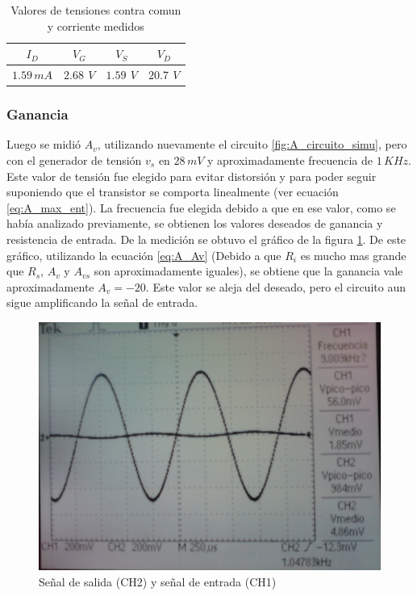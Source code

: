 \documentclass[10pt,spanish,a4paper,notitlepage]{article}
\begin{document}
\begin{table}[H]
    \centering
    \begin{tabular}{|c|c|c|c|} %
    \hline
    $I_D$ & $V_{G}$ & $V_{S}$ & $V_{D}$ \\ \hline
     $1.59\,\unit{mA}$ & $2.68\,\unit{\ V}$  & $1.59\,\unit{\ V}$  & $20.7\,\unit{\ V}$  \\ \hline
    \end{tabular}
    \caption{Valores de tensiones contra comun y corriente medidos}
    \label{table:tabla_Q_medido}
    \end{table}

\subsubsection{Ganancia}
Luego se midió $A_v$, utilizando nuevamente el circuito \ref{fig:A_circuito_simu}, pero con el generador de tensión $v_s$ en $28\,\unit{mV}$ y aproximadamente frecuencia de $1\,\unit{KHz}$. Este valor de tensión fue elegido para evitar distorsión y para poder seguir suponiendo que el transistor se comporta linealmente (ver ecuación \ref{eq:A_max_ent}). La frecuencia fue elegida debido a que en ese valor, como se había analizado previamente, se obtienen los valores deseados de ganancia y resistencia de entrada. De la medición se obtuvo el gráfico de la figura \ref{fig:1_Av}. De este gráfico, utilizando la ecuación \ref{eq:A_Av} (Debido a que $R_i$ es mucho mas grande que $R_s$, $A_v$ y $A_{vs}$ son aproximadamente iguales), se obtiene que la ganancia vale aproximadamente $A_v=-20$. Este valor se aleja del deseado, pero el circuito aun sigue amplificando la señal de entrada.


\begin{figure}[H]
\centering
\includegraphics[scale=0.2]{mediciones/1_Av.jpg}
\caption{Señal de salida (CH2) y señal de entrada (CH1)}
\label{fig:1_Av}
\end{figure}
\end{document}
